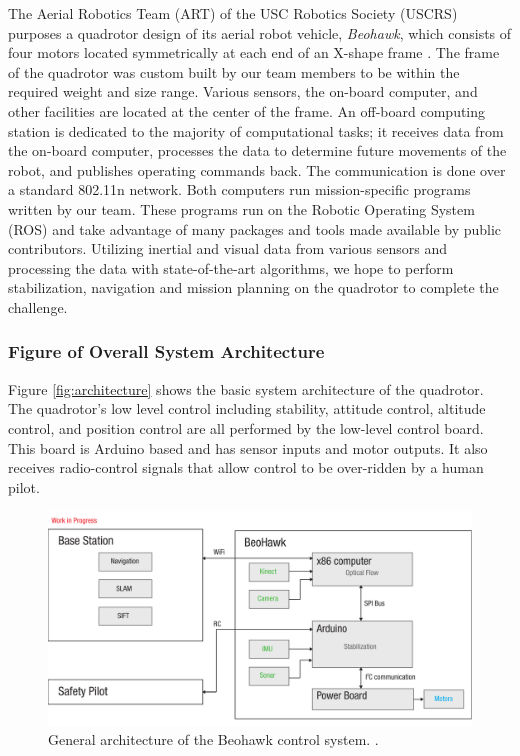 \documentclass[12pt, letterpaper]{article}
\begin{document}
The Aerial Robotics Team (ART) of the USC Robotics Society (USCRS) purposes a quadrotor design of its aerial robot vehicle, \textit{Beohawk}, which consists of four motors located symmetrically at each end of an X-shape frame . The frame of the quadrotor was custom built by our team members to be within the required weight and size range. Various sensors, the on-board computer, and other facilities are located at the center of the frame. An off-board computing station is dedicated to the majority of computational tasks; it receives data from the on-board computer, processes the data to determine future movements of the robot, and publishes operating commands back. The communication is done over a standard 802.11n network. Both computers run mission-specific programs written by our team. These programs run on the Robotic Operating System (ROS) and take advantage of many packages and tools made available by public contributors. Utilizing inertial and visual data from various sensors and processing the data with state-of-the-art algorithms, we hope to perform stabilization, navigation and mission planning on the quadrotor to complete the challenge.

\subsubsection{Figure of Overall System Architecture}

Figure \eqref{fig:architecture} shows the basic system architecture of the quadrotor. The quadrotor's low level control including stability, attitude control, altitude control, and position control are all performed by the low-level control board. This board is Arduino based and has sensor inputs and motor outputs. It also receives radio-control signals that allow control to be over-ridden by a human pilot.

\begin{figure}[h]
\centering
\includegraphics[width=14cm]{images/beohawk-system-arch.pdf}
\caption{General architecture of the Beohawk control system. .} 
\label{fig:architecture}
\end{figure}
\end{document}
